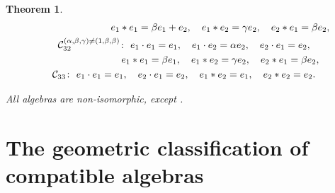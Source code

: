 \documentclass[pdftex]{sigma}
\numberwithin{equation}{section}
\newtheorem{Theorem}{Theorem}[section]
\begin{document}
\begin{Theorem}
\begin{gather*}
\hphantom{\mathcal{C}_{31}^{(\alpha ,\beta ,\gamma) \neq (1,\beta,\beta) } \colon} \
 e_{1}\ast e_{1}=\beta e_{1}+e_{2} , \quad e_{1}\ast e_{2}=\gamma e_{2} , \quad
e_{2}\ast e_{1}=\beta e_{2},
\\
 \mathcal{C}_{32}^{(\alpha ,\beta ,\gamma) \neq (1,\beta,\beta) } \colon\
e_{1}\cdot e_{1}=e_{1} , \quad e_{1}\cdot e_{2}=\alpha e_{2} , \quad e_{2}\cdot
e_{1}=e_{2} , \\
\hphantom{\mathcal{C}_{32}^{(\alpha ,\beta ,\gamma) \neq (1,\beta,\beta) } \colon} \
 e_{1}\ast e_{1}=\beta e_{1} , \quad e_{1}\ast e_{2}=\gamma e_{2} , \quad
e_{2}\ast e_{1}=\beta e_{2},
\\
 \mathcal{C}_{33} \colon\
 e_{1}\cdot e_{1}=e_{1} , \quad e_{2}\cdot e_{1}=e_{2} , \quad
 e_{1}\ast e_{2}=e_{1} , \quad e_{2}\ast e_{2}=e_{2}. %
\end{gather*}

All algebras are non-isomorphic, except
.
\end{Theorem}

\section{The geometric classification of compatible algebras}
\end{document}
